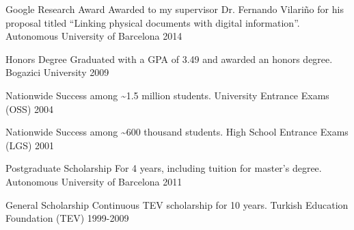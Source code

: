


\begin{cvhonors}

  \cvhonor
    {Google Research Award} %
    {Awarded to my supervisor Dr. Fernando Vilari\~no for his proposal titled ``Linking physical documents with digital information''.} %
    {Autonomous University of Barcelona} %
    {2014} %

  \cvhonor
    {Honors Degree} %
    {Graduated with a GPA of 3.49 and awarded an honors degree.} %
    {Bogazici University} %
    {2009} %

  \cvhonor
    {Nationwide Success} %
    {\textbf{} among \textasciitilde{}1.5 million students.} %
    {University Entrance Exams (OSS)} %
    {2004} %

  \cvhonor
    {Nationwide Success} %
    {\textbf{} among \textasciitilde{}600 thousand students.} %
    {High School Entrance Exams (LGS)} %
    {2001} %
\end{cvhonors}



\begin{cvhonors}
  \cvhonor
    {Postgraduate Scholarship} %
    {For 4 years, including tuition for master's degree.} %
    {Autonomous University of Barcelona} %
    {2011} %

  \cvhonor
    {General Scholarship} %
    {Continuous TEV scholarship for 10 years.} %
    {Turkish Education Foundation (TEV)} %
    {1999-2009} %

\end{cvhonors}
